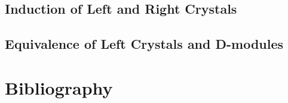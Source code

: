 \documentclass{article}
\begin{document}
  \subsection{Induction of Left and Right Crystals}

  \subsection{Equivalence of Left Crystals and D-modules}




\section{Bibliography}
\printbibliography
\end{document}
